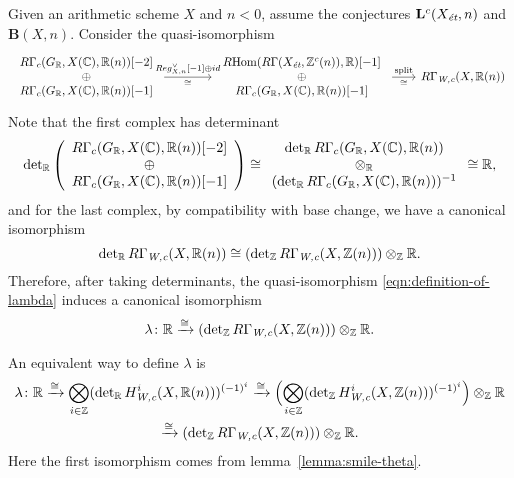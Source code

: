 \documentclass{article}
\numberwithin{equation}{section}
\begin{document}
\begin{definition}
  Given an arithmetic scheme $X$ and $n < 0$, assume the conjectures
  $\mathbf{L}^c (X_\et, n)$ and $\mathbf{B} (X,n)$. Consider the
  quasi-isomorphism
  \begin{equation}
    \label{eqn:definition-of-lambda}
    \begin{tikzcd}[column sep=4em]
      \begin{array}{c} R\Gamma_c (G_\RR, X (\CC), \RR (n)) [-2] \\ \oplus \\ R\Gamma_c (G_\RR, X (\CC), \RR (n)) [-1] \end{array} \ar{r}{Reg_{X,n}^\vee [-1] \oplus id}[swap]{\cong} & \begin{array}{c} \RHom (R\Gamma (X_\et, \ZZ^c (n)), \RR) [-1] \\ \oplus \\ R\Gamma_c (G_\RR, X (\CC), \RR (n)) [-1] \end{array} \ar{r}{\text{split}}[swap]{\cong} &[-2em] R\Gamma_\Wc (X, \RR (n))
    \end{tikzcd}
  \end{equation}
  Note that the first complex has determinant
  \[ \det_\RR \left(\begin{array}{c} R\Gamma_c (G_\RR, X (\CC), \RR (n)) [-2] \\ \oplus \\ R\Gamma_c (G_\RR, X (\CC), \RR (n)) [-1] \end{array}\right) \cong
    \begin{array}{c} \det_\RR R\Gamma_c (G_\RR, X (\CC), \RR (n)) \\ \otimes_\RR \\ (\det_\RR R\Gamma_c (G_\RR, X (\CC), \RR (n)))^{-1} \end{array} \cong \RR, \]
  and for the last complex, by compatibility with base change, we have a
  canonical isomorphism
  \[ \det_\RR R\Gamma_\Wc (X, \RR (n)) \cong
    (\det_\ZZ R\Gamma_\Wc (X, \ZZ (n))) \otimes_\ZZ \RR. \]
  Therefore, after taking determinants, the quasi-isomorphism
  \eqref{eqn:definition-of-lambda} induces a canonical isomorphism
  \begin{equation}
    \label{eqn:morphism-lambda}
    \lambda\colon \RR \xrightarrow{\cong}
    (\det_\ZZ R\Gamma_\Wc (X, \ZZ (n))) \otimes_\ZZ \RR.
  \end{equation}
\end{definition}

\begin{remark}
  An equivalent way to define $\lambda$ is
  \begin{multline*}
    \lambda\colon \RR \xrightarrow{\cong}
    \bigotimes_{i\in \ZZ} (\det_\RR H^i_\Wc (X, \RR (n)))^{(-1)^i} \xrightarrow{\cong}
    \Bigl(\bigotimes_{i\in \ZZ} (\det_\ZZ H^i_\Wc (X, \ZZ (n)))^{(-1)^i}\Bigr) \otimes_\ZZ \RR \\
    \xrightarrow{\cong} (\det_\ZZ R\Gamma_\Wc (X, \ZZ (n))) \otimes_\ZZ \RR.
  \end{multline*}
  Here the first isomorphism comes from lemma~\ref{lemma:smile-theta}.
\end{remark}
\end{document}
